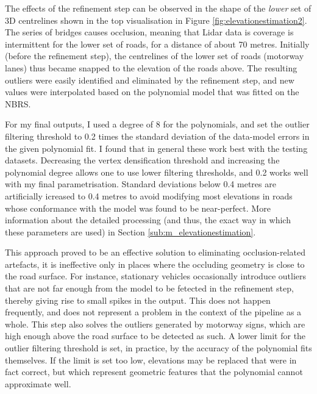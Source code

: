 The effects of the refinement step can be observed in the shape of the \textit{lower} set of 3D centrelines shown in the top visualisation in Figure \ref{fig:elevationestimation2}. The series of bridges causes occlusion, meaning that Lidar data is coverage is intermittent for the lower set of roads, for a distance of about 70 metres. Initially (before the refinement step), the centrelines of the lower set of roads (motorway lanes) thus became snapped to the elevation of the roads above. The resulting outliers were easily identified and eliminated by the refinement step, and new values were interpolated based on the polynomial model that was fitted on the NBRS.

For my final outputs, I used a degree of 8 for the polynomials, and set the outlier filtering threshold to 0.2 times the standard deviation of the data-model errors in the given polynomial fit. I found that in general these work best with the testing datasets. Decreasing the vertex densification threshold and increasing the polynomial degree allows one to use lower filtering thresholds, and 0.2 works well with my final parametrisation. Standard deviations below 0.4 metres are artificially icreased to 0.4 metres to avoid modifying most elevations in roads whose conformance with the model was found to be near-perfect. More information about the detailed processing (and thus, the exact way in which these parameters are used) in Section \ref{sub:m_elevationestimation}.

This approach proved to be an effective solution to eliminating occlusion-related artefacts, it is ineffective only in places where the occluding geometry is close to the road surface. For instance, stationary vehicles occasionally introduce outliers that are not far enough from the model to be fetected in the refinement step, thereby giving rise to small spikes in the output. This does not happen frequently, and does not represent a problem in the context of the pipeline as a whole. This step also solves the outliers generated by motorway signs, which are high enough above the road surface to be detected as such. A lower limit for the outlier filtering threshold is set, in practice, by the accuracy of the polynomial fits themselves. If the limit is set too low, elevations may be replaced that were in fact correct, but which represent geometric features that the polynomial cannot approximate well.

